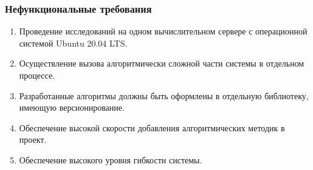 \begin{frame}
\frametitle{Нефункциональные требования}
\begin{enumerate}
    \item {
        Проведение исследований на одном вычислительном сервере с операционной системой Ubuntu 20.04 LTS.
    }
    \item {
        Осуществление вызова алгоритмически сложной части системы в отдельном процессе.
    }
    \item {
        Разработанные алгоритмы должны быть оформлены в отдельную библиотеку, имеющую версионирование.
    }
    \item {
        Обеспечение высокой скорости добавления алгоритмических методик в проект.
    }
    \item {
        Обеспечение высокого уровня гибкости системы.
    }
\end{enumerate}
\end{frame}
